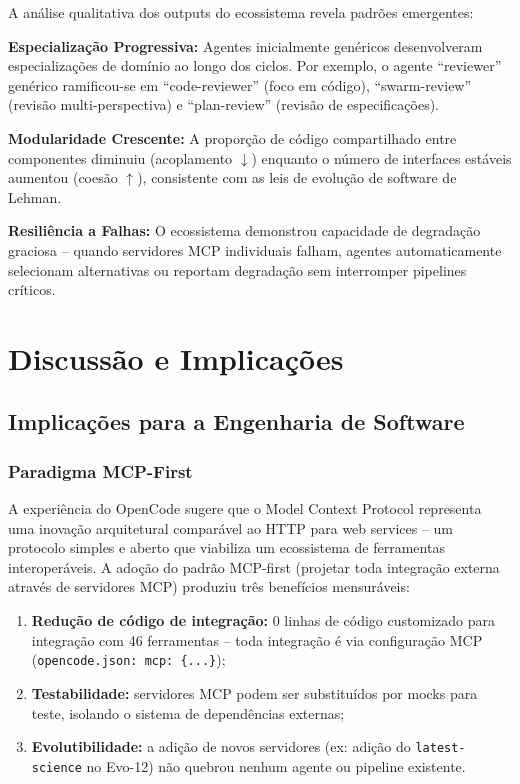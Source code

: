 \documentclass[12pt,a4paper,sumario=tradicional]{abntex2}
\begin{document}
A análise qualitativa dos outputs do ecossistema revela padrões emergentes:

\textbf{Especialização Progressiva:} Agentes inicialmente genéricos desenvolveram especializações de domínio ao longo dos ciclos. Por exemplo, o agente ``reviewer'' genérico ramificou-se em ``code-reviewer'' (foco em código), ``swarm-review'' (revisão multi-perspectiva) e ``plan-review'' (revisão de especificações).

\textbf{Modularidade Crescente:} A proporção de código compartilhado entre componentes diminuiu (acoplamento $\downarrow$) enquanto o número de interfaces estáveis aumentou (coesão $\uparrow$), consistente com as leis de evolução de software de Lehman.

\textbf{Resiliência a Falhas:} O ecossistema demonstrou capacidade de degradação graciosa -- quando servidores MCP individuais falham, agentes automaticamente selecionam alternativas ou reportam degradação sem interromper pipelines críticos.

\chapter{Discussão e Implicações}

\section{Implicações para a Engenharia de Software}

\subsection{Paradigma MCP-First}

A experiência do OpenCode sugere que o Model Context Protocol representa uma inovação arquitetural comparável ao HTTP para web services -- um protocolo simples e aberto que viabiliza um ecossistema de ferramentas interoperáveis. A adoção do padrão MCP-first (projetar toda integração externa através de servidores MCP) produziu três benefícios mensuráveis:

\begin{enumerate}[leftmargin=*]
    \item \textbf{Redução de código de integração:} 0 linhas de código customizado para integração com 46 ferramentas -- toda integração é via configuração MCP (\texttt{opencode.json: mcp: \{...\}});
    \item \textbf{Testabilidade:} servidores MCP podem ser substituídos por mocks para teste, isolando o sistema de dependências externas;
    \item \textbf{Evolutibilidade:} a adição de novos servidores (ex: adição do \texttt{latest-science} no Evo-12) não quebrou nenhum agente ou pipeline existente.
\end{enumerate}
\end{document}
